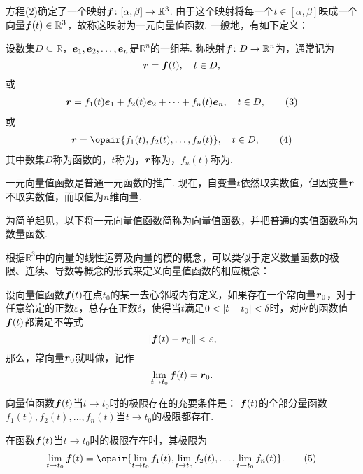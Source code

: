 方程(2)确定了一个映射\(\boldsymbol{f}\colon [\alpha,\beta]\to\mathbb{R}^3\).
由于这个映射将每一个\(t\in[\alpha,\beta]\)映成一个向量\(\boldsymbol{f}(t)\in\mathbb{R}^3\)，故称这映射为一元向量值函数.
一般地，有如下定义：
\begin{definition}
设数集\(D \subseteq \mathbb{R}\)，\(\boldsymbol{e}_1,\boldsymbol{e}_2,\dotsc,\boldsymbol{e}_n\)是\(\mathbb{R}^n\)的一组基.
称映射\(\boldsymbol{f}\colon D\to\mathbb{R}^n\)为，通常记为\[
\boldsymbol{r}=\boldsymbol{f}(t), \quad t \in D,
\]或\begin{gather}
\mat{r}=f_1(t)\mat{e}_1+f_2(t)\mat{e}_2+\dotsb+f_n(t)\mat{e}_n, \quad t \in D,
\tag3
\end{gather}或\begin{gather}
\mat{r}=\opair{f_1(t),f_2(t),\dotsc,f_n(t)}, \quad t \in D,
\tag4
\end{gather}其中数集\(D\)称为函数的，\(t\)称为，\(\boldsymbol{r}\)称为，\(f_n(t)\)称为.
\end{definition}
一元向量值函数是普通一元函数的推广.
现在，自变量\(t\)依然取实数值，但因变量\(\boldsymbol{r}\)不取实数值，而取值为\(n\)维向量.

为简单起见，以下将一元向量值函数简称为向量值函数，并把普通的实值函数称为数量函数.

根据\(\mathbb{R}^3\)中的向量的线性运算及向量的模的概念，可以类似于定义数量函数的极限、连续、导数等概念的形式来定义向量值函数的相应概念：
\begin{definition}
设向量值函数\(\boldsymbol{f}(t)\)在点\(t_0\)的某一去心邻域内有定义，如果存在一个常向量\(\boldsymbol{r}_0\)，对于任意给定的正数\(\varepsilon\)，总存在正数\(\delta\)，使得当\(t\)满足\(0 < \abs{t-t_0} < \delta\)时，对应的函数值\(\boldsymbol{f}(t)\)都满足不等式\[
\norm{\boldsymbol{f}(t)-\boldsymbol{r}_0} < \varepsilon,
\]那么，常向量\(\boldsymbol{r}_0\)就叫做，记作\[
\lim\limits_{t \to t_0} \boldsymbol{f}(t) = \boldsymbol{r}_0.
\]
\end{definition}

\begin{theorem}
\def\l{\lim\limits_{t \to t_0}}
向量值函数\(\boldsymbol{f}(t)\)当\(t \to t_0\)时的极限存在的充要条件是：
\(\boldsymbol{f}(t)\)的全部分量函数\(f_1(t),f_2(t),\dotsc,f_n(t)\)当\(t \to t_0\)的极限都存在.

在函数\(\boldsymbol{f}(t)\)当\(t \to t_0\)时的极限存在时，其极限为\begin{gather}
\l \mat{f}(t) = \opair{\l f_1(t),\l f_2(t),\dotsc,\l f_n(t)}.
\tag5
\end{gather}
\end{theorem}

